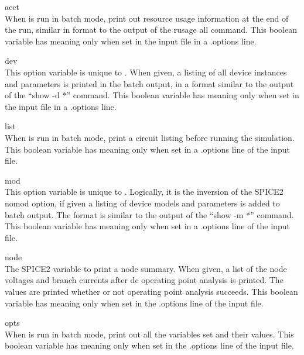 \begin{description}
\item{\et acct}\\
When {\WRspice} is run in batch mode, print out resource usage
information at the end of the run, similar in format to the output of
the {\vt rusage all} command.  This boolean variable has meaning only
when set in the input file in a {\vt .options} line.

\item{\et dev}\\
This option variable is unique to {\WRspice}.  When given, a listing
of all device instances and parameters is printed in the batch output,
in a format similar to the output of the ``{\vt show -d *}'' command. 
This boolean variable has meaning only when set in the input file in a
{\vt .options} line.

\item{\et list}\\
When {\WRspice} is run in batch mode, print a circuit listing before
running the simulation.  This boolean variable has meaning only when
set in a {\vt .options} line of the input file.

\item{\et mod}\\
This option variable is unique to {\WRspice}.  Logically, it is the
inversion of the SPICE2 {\vt nomod} option, if given a listing of
device models and parameters is added to batch output.  The format is
similar to the output of the ``{\vt show -m *}'' command.  This
boolean variable has meaning only when set in a {\vt .options} line
of the input file.

\item{\et node}\\
The SPICE2 variable to print a node summary.  When given, a list of
the node voltages and branch currents after dc operating point
analysis is printed.  The values are printed whether or not operating
point analysis succeeds.  This boolean variable has meaning only when
set in the {\vt .options} line of the input file.

\item{\et opts}\\
When {\WRspice} is run in batch mode, print out all the variables set and
their values.  This boolean variable has meaning only when set in the
{\vt .options} line of the input file.


\end{description}
